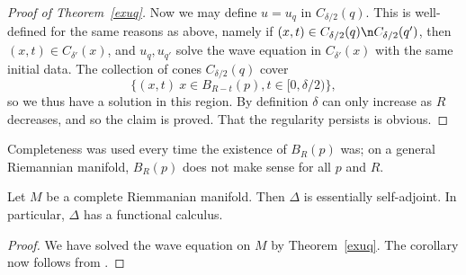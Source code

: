 \documentclass[12pt]{article}
\begin{document}
\begin{proof}[Proof of Theorem~\ref{exuq}]
Now we may define $u = u_q$ in $C_{\delta/2}(q)$. This is well-defined for the same reasons as above, namely if $(x,t) \in C_{\delta/2}(q)\n C_{\delta/2}(q')$, then $(x,t) \in C_{\delta'}(x)$, and $u_q,u_{q'}$ solve the wave equation in $C_{\delta'}(x)$ with the same initial data. The collection of cones $C_{\delta/2}(q)$ cover
\[\{(x,t)\: x \in B_{R-t}(p), t \in [0,\delta/2)\},\]
so we thus have a solution in this region. By definition $\delta$ can only increase as $R$ decreases, and so the claim is proved. That the regularity persists is obvious.
\end{proof}
\begin{rk}Completeness was used every time the existence of $B_R(p)$ was; on a general Riemannian manifold, $B_R(p)$ does not make sense for all $p$ and $R$.\end{rk}

\begin{cor}Let $M$ be a complete Riemmanian manifold. Then $\Delta$ is essentially self-adjoint. In particular, $\Delta$ has a functional calculus.\end{cor}
\begin{proof}We have solved the wave equation on $M$ by Theorem~\ref{exuq}. The corollary now follows from \cite[Theorem 7, Exercise 29]{Tao}.\end{proof}






\begin{bibdiv}
\begin{biblist}

\newcommand{\perafter}[1]{#1.}




			


\end{biblist}
\end{bibdiv}
\end{document}
